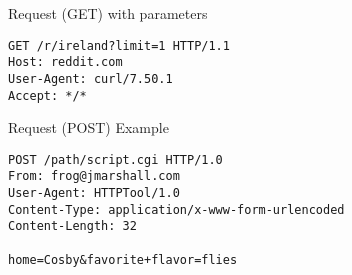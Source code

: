 \begin{frame}[fragile]{Request (GET) with parameters}
  \begin{verbatim}
GET /r/ireland?limit=1 HTTP/1.1
Host: reddit.com
User-Agent: curl/7.50.1
Accept: */*

  \end{verbatim}
\end{frame}


\begin{frame}[fragile]{Request (POST) Example}
  \begin{verbatim}
POST /path/script.cgi HTTP/1.0
From: frog@jmarshall.com
User-Agent: HTTPTool/1.0
Content-Type: application/x-www-form-urlencoded
Content-Length: 32

home=Cosby&favorite+flavor=flies
  \end{verbatim}
\end{frame}
